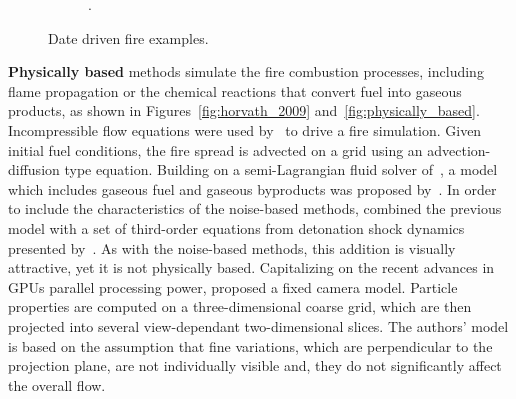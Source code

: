 \begin{figure}[htpb!]
\begin{subfigure}[t]{0.38\textwidth}
                \caption{\cite{Zhang:2011}.}
        \end{subfigure}                   
        \caption{Date driven fire examples.}
        \label{fig:data_driven}
\end{figure}

\textbf{Physically based} methods simulate the fire combustion processes, including flame propagation or the chemical reactions that convert fuel into gaseous products, as shown in Figures~\ref{fig:horvath_2009} and~\ref{fig:physically_based}.  
Incompressible flow equations were used by~\cite{Stam:1995} to drive a fire simulation.
Given initial fuel conditions, the fire spread is advected on a grid using an advection-diffusion type equation.
Building on a semi-Lagrangian fluid solver of~\cite{Stam:1999}, a model which includes gaseous fuel and gaseous byproducts was proposed by~\cite{Nguyen:2002}.
In order to include the characteristics of the noise-based methods, \cite{Hong:2007} combined the previous model with a set of third-order equations from detonation shock dynamics presented by~\cite{Yao:1996}.
As with the noise-based methods, this addition is visually attractive, yet it is not physically based. 
Capitalizing on the recent advances in GPUs parallel processing power, \cite{Horvath:2009} proposed a fixed camera model.
Particle properties are computed on a three-dimensional coarse grid, which are then projected into several view-dependant two-dimensional slices.
The authors' model is based on the assumption that fine variations, which are perpendicular to the projection plane, are not individually visible and, they do not significantly affect the overall flow.


